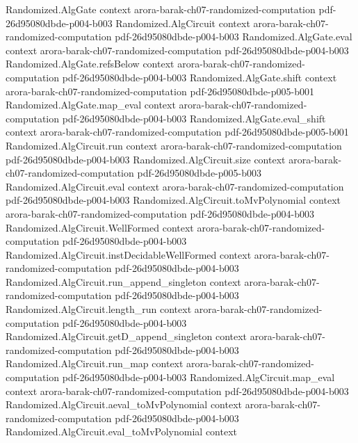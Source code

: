 \begin{theorem}
\proofstep
  {Randomized.AlgGate}
  {context}
  {arora-barak-ch07-randomized-computation}
  {pdf-26d95080dbde-p004-b003}
\proofstep
  {Randomized.AlgCircuit}
  {context}
  {arora-barak-ch07-randomized-computation}
  {pdf-26d95080dbde-p004-b003}
\proofstep
  {Randomized.AlgGate.eval}
  {context}
  {arora-barak-ch07-randomized-computation}
  {pdf-26d95080dbde-p004-b003}
\proofstep
  {Randomized.AlgGate.refsBelow}
  {context}
  {arora-barak-ch07-randomized-computation}
  {pdf-26d95080dbde-p004-b003}
\proofstep
  {Randomized.AlgGate.shift}
  {context}
  {arora-barak-ch07-randomized-computation}
  {pdf-26d95080dbde-p005-b001}
\proofstep
  {Randomized.AlgGate.map_eval}
  {context}
  {arora-barak-ch07-randomized-computation}
  {pdf-26d95080dbde-p004-b003}
\proofstep
  {Randomized.AlgGate.eval_shift}
  {context}
  {arora-barak-ch07-randomized-computation}
  {pdf-26d95080dbde-p005-b001}
\proofstep
  {Randomized.AlgCircuit.run}
  {context}
  {arora-barak-ch07-randomized-computation}
  {pdf-26d95080dbde-p004-b003}
\proofstep
  {Randomized.AlgCircuit.size}
  {context}
  {arora-barak-ch07-randomized-computation}
  {pdf-26d95080dbde-p005-b003}
\proofstep
  {Randomized.AlgCircuit.eval}
  {context}
  {arora-barak-ch07-randomized-computation}
  {pdf-26d95080dbde-p004-b003}
\proofstep
  {Randomized.AlgCircuit.toMvPolynomial}
  {context}
  {arora-barak-ch07-randomized-computation}
  {pdf-26d95080dbde-p004-b003}
\proofstep
  {Randomized.AlgCircuit.WellFormed}
  {context}
  {arora-barak-ch07-randomized-computation}
  {pdf-26d95080dbde-p004-b003}
\proofstep
  {Randomized.AlgCircuit.instDecidableWellFormed}
  {context}
  {arora-barak-ch07-randomized-computation}
  {pdf-26d95080dbde-p004-b003}
\proofstep
  {Randomized.AlgCircuit.run_append_singleton}
  {context}
  {arora-barak-ch07-randomized-computation}
  {pdf-26d95080dbde-p004-b003}
\proofstep
  {Randomized.AlgCircuit.length_run}
  {context}
  {arora-barak-ch07-randomized-computation}
  {pdf-26d95080dbde-p004-b003}
\proofstep
  {Randomized.AlgCircuit.getD_append_singleton}
  {context}
  {arora-barak-ch07-randomized-computation}
  {pdf-26d95080dbde-p004-b003}
\proofstep
  {Randomized.AlgCircuit.run_map}
  {context}
  {arora-barak-ch07-randomized-computation}
  {pdf-26d95080dbde-p004-b003}
\proofstep
  {Randomized.AlgCircuit.map_eval}
  {context}
  {arora-barak-ch07-randomized-computation}
  {pdf-26d95080dbde-p004-b003}
\proofstep
  {Randomized.AlgCircuit.aeval_toMvPolynomial}
  {context}
  {arora-barak-ch07-randomized-computation}
  {pdf-26d95080dbde-p004-b003}
\proofstep
  {Randomized.AlgCircuit.eval_toMvPolynomial}
  {context}

\end{theorem}
